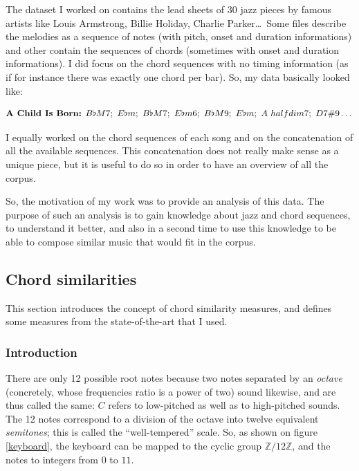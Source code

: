 \documentclass[a4paper,10pt]{article}
\newcommand{\guill}[1]{``#1''}
\begin{document}
The dataset I worked on contains the lead sheets of 30 jazz pieces by famous artists like Louis Armstrong, Billie Holiday, Charlie Parker\dots~Some files describe the melodies as a sequence of notes (with pitch, onset and duration informations) and other contain the sequences of chords (sometimes with onset and duration informations). I did focus on the chord sequences with no timing information (as if for instance there was exactly one chord per bar). So, my data basically looked like:

\begin{equation*}
\text{\textbf{A Child Is Born:} } B\flat M7;~E\flat m;~B\flat M7;~E\flat m6;~B\flat M9;~E\flat m;~A~halfdim7;~D 7\#9\dots
\end{equation*}

I equally worked on the chord sequences of each song and on the concatenation of all the available sequences. This concatenation does not really make sense as a unique piece, but it is useful to do so in order to have an overview of all the corpus.

So, the motivation of my work was to provide an analysis of this data. The purpose of such an analysis is to gain knowledge about jazz and chord sequences, to understand it better, and also in a second time to use this knowledge to be able to compose similar music that would fit in the corpus.



\subsection{Chord similarities}

This section introduces the concept of chord similarity measures, and defines some measures from the state-of-the-art that I used.

\subsubsection{Introduction}

There are only 12 possible root notes because two notes separated by an \emph{octave} (concretely, whose frequencies ratio is a power of two) sound likewise, and are thus called the same: $C$ refers to low-pitched as well as to high-pitched sounds. The 12 notes correspond to a division of the octave into twelve equivalent \emph{semitones}; this is called the \guill{well-tempered} scale. 
So, as shown on figure \ref{keyboard}, the keyboard can be mapped to the cyclic group $\mathbb{Z}/12\mathbb{Z}$, and the notes to integers from $0$ to $11$.
\end{document}
